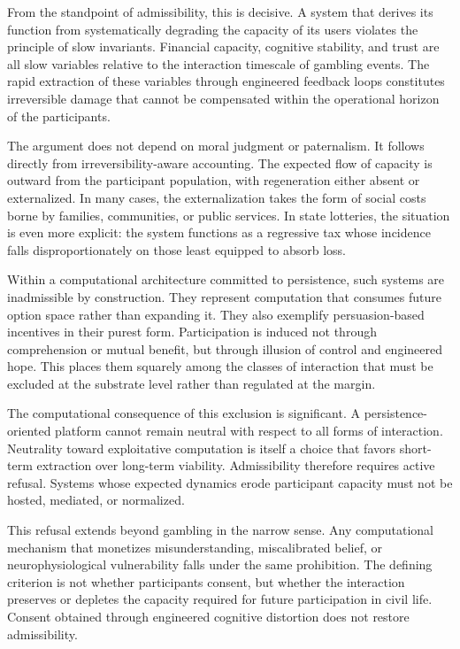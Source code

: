 \documentclass[12pt,oneside]{book}
\begin{document}
From the standpoint of admissibility, this is decisive. A system that derives its function from systematically degrading the capacity of its users violates the principle of slow invariants. Financial capacity, cognitive stability, and trust are all slow variables relative to the interaction timescale of gambling events. The rapid extraction of these variables through engineered feedback loops constitutes irreversible damage that cannot be compensated within the operational horizon of the participants.

The argument does not depend on moral judgment or paternalism. It follows directly from irreversibility-aware accounting. The expected flow of capacity is outward from the participant population, with regeneration either absent or externalized. In many cases, the externalization takes the form of social costs borne by families, communities, or public services. In state lotteries, the situation is even more explicit: the system functions as a regressive tax whose incidence falls disproportionately on those least equipped to absorb loss.

Within a computational architecture committed to persistence, such systems are inadmissible by construction. They represent computation that consumes future option space rather than expanding it. They also exemplify persuasion-based incentives in their purest form. Participation is induced not through comprehension or mutual benefit, but through illusion of control and engineered hope. This places them squarely among the classes of interaction that must be excluded at the substrate level rather than regulated at the margin.

The computational consequence of this exclusion is significant. A persistence-oriented platform cannot remain neutral with respect to all forms of interaction. Neutrality toward exploitative computation is itself a choice that favors short-term extraction over long-term viability. Admissibility therefore requires active refusal. Systems whose expected dynamics erode participant capacity must not be hosted, mediated, or normalized.

This refusal extends beyond gambling in the narrow sense. Any computational mechanism that monetizes misunderstanding, miscalibrated belief, or neurophysiological vulnerability falls under the same prohibition. The defining criterion is not whether participants consent, but whether the interaction preserves or depletes the capacity required for future participation in civil life. Consent obtained through engineered cognitive distortion does not restore admissibility.
\end{document}
